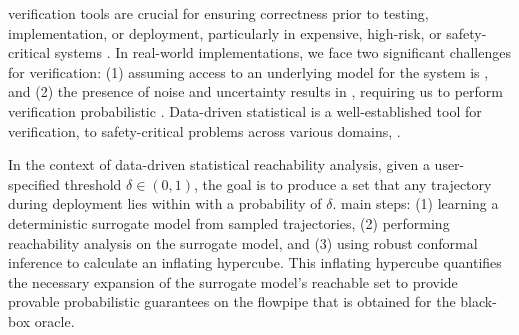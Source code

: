  verification tools are crucial for ensuring correctness prior to testing, implementation, or deployment, particularly in expensive, high-risk, or safety-critical systems \cite{zhang2023reachability,schilling2022verification,komendera2012intelligent}. In real-world implementations, we face two significant challenges for  verification: (1) assuming access to an underlying model for the system is , and (2) the presence of noise and uncertainty results in , requiring us to perform  verification  probabilistic . Data-driven statistical  is a well-established tool for  verification,  to safety-critical problems across various domains,  \cite{devonport2021data,fisac2018general,dryvr,hashemi2024statistical}. 

In the context of data-driven statistical reachability analysis, given a user-specified threshold $\delta \in (0,1)$, the goal is to produce a set that  any trajectory during deployment lies within  with a probability of  $\delta$. main steps: (1) learning a deterministic surrogate model from sampled trajectories, (2) performing reachability analysis on the surrogate model, and (3) using robust conformal inference  \cite{cauchois2020robust} to calculate an inflating hypercube. This inflating hypercube quantifies the necessary expansion of the surrogate model's reachable set to provide provable probabilistic guarantees on the flowpipe that is obtained for the black-box oracle. 



